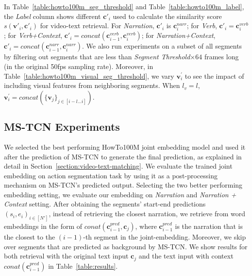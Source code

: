 In Table~\ref{table:howto100m_seg_threshold} and Table~\ref{table:howto100m_label}, the \textit{Label} column shows different $\mathbf{c}{'}_i$ used to calculate the similarity score $s(\mathbf{v}{'}_i, \mathbf{c}{'}_i)$ for video-text retrieval. For 
\textit{Narration}, $\mathbf{c}{'}_i$ is $\mathbf{c}^{narr}_i$; for 
\textit{Verb}, $\mathbf{c}{'}_i = \mathbf{c}^{verb}_i$; for \textit{Verb+Context}, $\mathbf{c}{'}_i = concat(\mathbf{c}^{verb}_{i-1}, \mathbf{c}^{verb}_i)$; for \textit{Narration+Context}, $\mathbf{c}{'}_i = concat(\mathbf{c}^{narr}_{i-1}, \mathbf{c}^{narr}_i)$. We also run experiments on a subset of all segments by filtering out segments that are less than \textit{Segment Threshold}$\times 64$ frames long (in the original 50fps sampling rate). Moreover, in Table~\ref{table:howto100m_visual_seg_threshold}, we vary $\mathbf{v}^{'}_i$ to see the impact of including visual features from neighboring segments. When $l_v = l$, 
$\mathbf{v}^{'}_i = concat(\{\mathbf{v}_j\}_{j\in [i-l\dots i]})$. 

\subsection{MS-TCN Experiments} \label{section:mstcn-experiments}
We selected the best performing HowTo100M joint embedding model and used it after the prediction of MS-TCN to generate the final prediction, as explained in detail in Section~\ref{section:video-text-matching}. We evaluate the trained joint embedding on action segmentation task by using it as a post-processing mechanism on MS-TCN's predicted output. Selecting the two better performing embedding setting, we evaluate our embedding on \textit{Narration} and \textit{Narration + Context} setting. After obtaining the segments' start-end predictions $(s_i,e_i)_{i \in [N']}$, instead of retrieving the closest narration, we retrieve from word embeddings in the form of 
$conat(\mathbf{c}^{pred}_{i-1}, \mathbf{c}_j)$, where $\mathbf{c}^{pred}_{i-1}$ is the narration that is the closest to the $(i-1)$-th segment in the joint-embedding. Moreover, we skip over segments that are predicted as background by MS-TCN. We show results for both retrieval with the original text input $\mathbf{c}_j$ and the text input with context $conat(\mathbf{c}^{pred}_{i-1})$ in Table~\ref{table:results}. 

\begin{table}[b]
\end{table}
